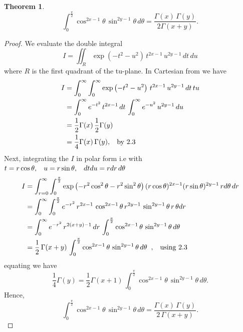 \documentclass[12pt,a4paper]{report}
\theoremstyle{definition}
\newtheorem{thm}{Theorem}[section]
\theoremstyle{plain}
\begin{document}
\begin{thm}
$$\int_0^{\frac{\pi}{2}}\cos^{2x - 1}\theta\, \sin^{2y-1}\theta\, d\theta = \frac{\Gamma(x)\, \Gamma(y)}{2\Gamma(x+y)}.$$
\end{thm}

\begin{proof}
We evaluate the double integral $$I = \iint_R \exp\left(-t^2 - u^2\right)\, t^{2x-1}\, u^{2y-1}\, dt\, du$$ where $R$ is the  first quadrant of the tu-plane.
In Cartesian from we have
\begin{align*}
I & = \int^{\infty}_0\int_0^{\infty} \exp\left(-t^2-u^2\right) \, t^{2x-1}\, u^{2y-1}\, dt\, tu\\
  & = \int^{\infty}_0e^{-t^2}\, t^{2x-1}\, dt\, \int^{\infty}_0e^{-u^2}\, u^{2y-1}\, du\\
  & = \frac{1}{2}\Gamma(x)\, \frac{1}{2}\Gamma(y)\\
  & = \frac{1}{4}\Gamma(x)\, \Gamma(y), \hspace{0.3cm}\text{by}\,\, 2.3
\end{align*}
Next, integrating the $I$ in polar form i.e
with $t = r\cos \theta, \hspace{0.3cm} u = r\sin\theta,\hspace{0.3cm} dtdu = rdr\, d\theta$
\begin{align*}
I & = \int_{r=0}^{\infty} \int_0^{\frac{\pi}{2}} \exp\left(-r^2\cos^2\theta - r^2\sin^2\theta\right)(r\cos\theta)^{2x-1}(r\sin\theta)^{2y-1}\, rd\theta\, dr\\
& = \int^{\infty}_0\int_0^{\frac{\pi}{2}} e^{-r^2}\, r^{2x - 1}\, \cos^{2x-1}\theta\, r^{2y-1}\, \sin^{2y-1}\theta\, r\,\theta dr\\
& = \int_0^{\infty} e^{-r^2}\, r^{2(x+y) - 1}\, dr\, \int_0^{\frac{\pi}{2}}\cos^{2x-1}\theta\, \sin^{2y-1}\theta\, d\theta\\
& = \frac{1}{2}\, \Gamma(x+y)\, \int^{\frac{\pi}{2}}_0\cos^{2x-1}\theta\, \sin^{2y-1}\theta\, d\theta\hspace{0.2cm},  \hspace{0.3cm}\text{using}\,\, 2.3
\end{align*}
equating we have
$$\frac{1}{4}\Gamma(y) = \frac{1}{2}\Gamma(x+1)\, \int_0^{\frac{\pi}{2}}\cos^{2x - 1}\theta\, \sin^{2y-1}\theta\, d\theta.$$
Hence,
$$\int^{\frac{\pi}{2}}_0\cos^{2x-1}\theta\, \sin^{2y-1}\theta\, d\theta = \frac{\Gamma(x)\, \Gamma(y)}{2\, \Gamma(x+y)}.$$
\end{proof}
\end{document}
